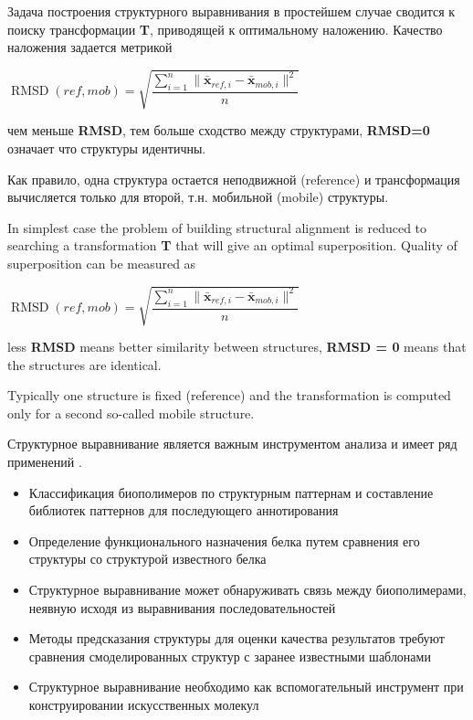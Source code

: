 \documentclass[a4paper, 12pt, titlepage, utf8]{extarticle}
\begin{document}
\begin{original}
Задача построения структурного выравнивания в простейшем случае сводится к
поиску трансформации \textbf{T}, приводящей к оптимальному наложению. Качество
наложения задается метрикой
\begin{center} $ \operatorname{RMSD}(ref, mob) = \sqrt{ \dfrac{\sum_{i=1}^n \|
\mathbf{\bar{x}}_{ref,i} -  \mathbf{\bar{x}}_{mob,i} \| ^2} {n} } $ \end{center}
чем меньше \textbf{RMSD}, тем больше сходство между структурами,
\textbf{RMSD=0}  означает что структуры идентичны.

Как правило, одна структура остается неподвижной (reference) и трансформация
вычисляется только для второй, т.н. мобильной (mobile) структуры.
\end{original}

In simplest case the problem of building structural alignment is reduced to
searching  a transformation \textbf{T} that will give an optimal superposition.
Quality of superposition can be measured as
\begin{center} $ \operatorname{RMSD}(ref, mob) = \sqrt{ \dfrac{\sum_{i=1}^n \|
\mathbf{\bar{x}}_{ref,i} -  \mathbf{\bar{x}}_{mob,i} \| ^2} {n} } $ \end{center}
less \textbf{RMSD} means better similarity between structures, \textbf {RMSD =
0} means that the structures are identical.

Typically one structure is fixed (reference) and the transformation is computed
only for a second so-called mobile structure.

\begin{original}
Структурное выравнивание является важным инструментом анализа и имеет ряд
применений \cite{structural-bionformatics}.
\begin{itemize}
    \item Классификация биополимеров по структурным паттернам и составление
библиотек паттернов для последующего аннотирования
    \item Определение функционального назначения белка путем сравнения его
структуры со структурой известного белка
    \item Структурное выравнивание может обнаруживать связь между биополимерами,
неявную исходя из выравнивания последовательностей
    \item Методы предсказания структуры для оценки качества результатов требуют
сравнения смоделированных структур с заранее известными шаблонами
    \item Структурное выравнивание необходимо как вспомогательный инструмент при
конструировании искусственных молекул
\end{itemize}
\end{original}
\end{document}
